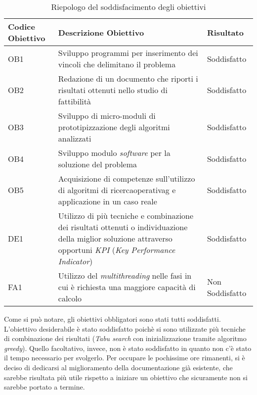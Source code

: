 \begin{center}
    \begin{longtable}{m{3cm}m{9cm}m{2cm}}
    \caption{Riepologo del soddisfacimento degli obiettivi}
    \label{tab:raggiungimento-obiettivi}
    \\ \hline
    \centering \textbf{Codice Obiettivo} & \centering \textbf{Descrizione Obiettivo} & \centering \textbf{Risultato} \arraybackslash \\
    \hline
    \centering OB1 & Sviluppo programmi per inserimento
    dei vincoli che delimitano il problema & \centering Soddisfatto \arraybackslash \\
    \hline
    \centering OB2 & Redazione di un documento che riporti
    i risultati ottenuti nello studio di fattibilità & \centering Soddisfatto \arraybackslash \\
    \hline
    \centering OB3 & Sviluppo di micro-moduli di prototipizzazione degli algoritmi analizzati & \centering Soddisfatto \arraybackslash \\
    \hline
    \centering OB4 & Sviluppo modulo \textit{software} per
    la soluzione del problema & \centering Soddisfatto \arraybackslash \\
    \hline
    \centering OB5 & Acquisizione di competenze sull’utilizzo
    di algoritmi di \gls{ricercaoperativag} e
    applicazione in un caso reale & \centering Soddisfatto \arraybackslash \\
    \hline
    \centering DE1 & Utilizzo di più tecniche e combinazione dei risultati
    ottenuti o individuazione della miglior soluzione attraverso
    opportuni \textit{KPI} (\textit{Key Performance Indicator}) & \centering Soddisfatto \arraybackslash \\
    \hline
    \centering FA1 & Utilizzo del \textit{multithreading}
    nelle fasi in cui è richiesta una
    maggiore capacità di calcolo & \centering Non Soddisfatto \arraybackslash \\
    \hline
    \end{longtable}
\end{center}%

\noindent Come si può notare, gli obiettivi obbligatori
sono stati tutti soddisfatti.
L'obiettivo desiderabile è stato soddisfatto poichè si sono utilizzate più tecniche
di combinazione dei risultati (\textit{Tabu search} con inizializzazione tramite algoritmo \textit{greedy}).
Quello facoltativo, invece, non è stato soddisfatto in quanto
non c'è stato il tempo necessario per
svolgerlo.
Per occupare le pochissime ore rimanenti, si è deciso di dedicarsi
al miglioramento della documentazione già esistente, che sarebbe risultata
più utile rispetto a iniziare un obiettivo che sicuramente non si sarebbe portato a termine.

